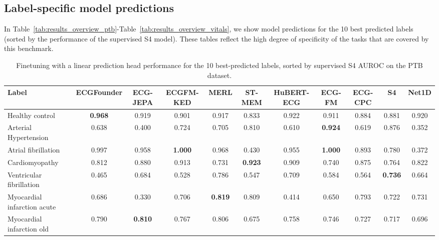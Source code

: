 \documentclass{article}
\begin{document}
            \subsection{Label-specific model predictions}\label{sec:label_preds}
            In Table~\ref{tab:results_overview_ptb}-Table~\ref{tab:results_overview_vitals}, we show model predictions for the 10 best predicted labels (sorted by the performance of the supervised S4 model). These tables reflect the high degree of specificity of the tasks that are covered by this benchmark.
            
            
                \begin{table}[htbp]
                    \centering
                    \tiny
                    \setlength{\tabcolsep}{2pt}
                    \caption{Finetuning with a linear prediction head performance for the 10 best-predicted labels, sorted by supervised S4 AUROC on the PTB dataset.}
                    \begin{tabular}{lcccccccccc}
                        \toprule
                        \textbf{Label} & \textbf{ECGFounder} & \textbf{ECG-JEPA} & \textbf{ECGFM-KED} & \textbf{MERL} & \textbf{ST-MEM} & \textbf{HuBERT-ECG} & \textbf{ECG-FM} & \textbf{ECG-CPC} & \textbf{S4} & \textbf{Net1D} \\
                        \midrule
                        Healthy control & \textbf{0.968} & 0.919 & 0.901 & 0.917 & 0.833 & 0.922 & 0.911 & 0.884 & 0.881 & 0.920 \\
                        Arterial Hypertension & 0.638 & 0.400 & 0.724 & 0.705 & 0.810 & 0.610 & \textbf{0.924} & 0.619 & 0.876 & 0.352 \\
                        Atrial fibrillation & 0.997 & 0.958 & \textbf{1.000} & 0.968 & 0.430 & 0.955 & \textbf{1.000} & 0.893 & 0.780 & 0.372 \\
                        Cardiomyopathy & 0.812 & 0.880 & 0.913 & 0.731 & \textbf{0.923} & 0.909 & 0.740 & 0.875 & 0.764 & 0.822 \\
                        Ventricular fibrillation & 0.465 & 0.684 & 0.528 & 0.786 & 0.547 & 0.709 & 0.584 & 0.564 & \textbf{0.736} & 0.664 \\
                        Myocardial infarction acute & 0.686 & 0.330 & 0.706 & \textbf{0.819} & 0.809 & 0.414 & 0.650 & 0.793 & 0.722 & 0.731 \\
                        Myocardial infarction old & 0.790 & \textbf{0.810} & 0.767 & 0.806 & 0.675 & 0.758 & 0.746 & 0.727 & 0.717 & 0.696 \\

\end{tabular}
\end{table}
\end{document}
